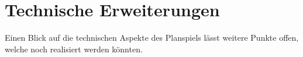\section{Technische Erweiterungen}
\label{sec:fazit-fachkonzept}

Einen Blick auf die technischen Aspekte des Planspiels lässt weitere Punkte offen, welche noch realisiert werden könnten. 



